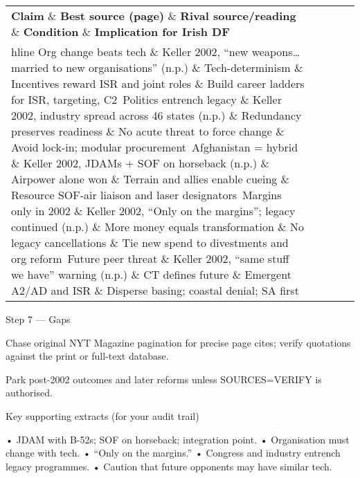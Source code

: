 \begin{tabular}{p{3.2cm}p{4.2cm}p{3.6cm}p{3.2cm}p{4.2cm}}
	\textbf{Claim} \& \textbf{Best source (page)} \& \textbf{Rival source/reading} \& \textbf{Condition} \& \textbf{Implication for Irish DF}\\hline
	Org change beats tech \& Keller 2002, “new weapons… married to new organisations” (n.p.) \& Tech-determinism \& Incentives reward ISR and joint roles \& Build career ladders for ISR, targeting, C2\
	Politics entrench legacy \& Keller 2002, industry spread across 46 states (n.p.) \& Redundancy preserves readiness \& No acute threat to force change \& Avoid lock-in; modular procurement\
	Afghanistan = hybrid \& Keller 2002, JDAMs + SOF on horseback (n.p.) \& Airpower alone won \& Terrain and allies enable cueing \& Resource SOF-air liaison and laser designators\
	Margins only in 2002 \& Keller 2002, “Only on the margins”; legacy continued (n.p.) \& More money equals transformation \& No legacy cancellations \& Tie new spend to divestments and org reform\
	Future peer threat \& Keller 2002, “same stuff we have” warning (n.p.) \& CT defines future \& Emergent A2/AD and ISR \& Disperse basing; coastal denial; SA first\
\end{tabular}

Step 7 — Gaps

Chase original NYT Magazine pagination for precise page cites; verify quotations against the print or full-text database.

Park post-2002 outcomes and later reforms unless SOURCES=VERIFY is authorised.

Key supporting extracts (for your audit trail)

• JDAM with B-52s; SOF on horseback; integration point.
• Organisation must change with tech.
• “Only on the margins.”
• Congress and industry entrench legacy programmes.
• Caution that future opponents may have similar tech.

\parencite{HUSAIN_2021}

